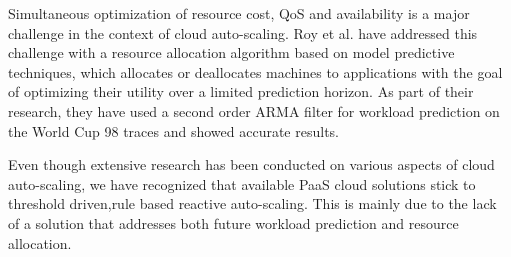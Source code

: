 Simultaneous optimization of resource cost, QoS and availability is a major challenge in the context of cloud auto-scaling. Roy et al. \cite{Roy_2011} have addressed this challenge with a resource allocation algorithm based on model predictive techniques, which allocates or deallocates machines to applications with the goal of optimizing their utility over a limited prediction horizon. As part of their research, they have used a second order ARMA filter for workload prediction on the World Cup 98 traces and showed accurate results.

Even though extensive research has been conducted on various aspects of cloud auto-scaling, we have recognized that available PaaS cloud solutions stick to threshold driven,rule based reactive auto-scaling. This is mainly due to the lack of a solution that addresses both future workload prediction and resource allocation.